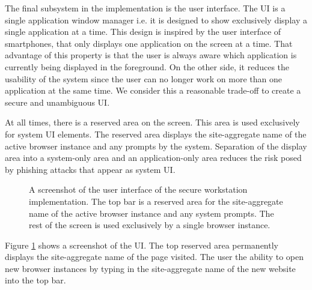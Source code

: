 The final subsystem in the implementation is the user interface. The UI is a single application window manager i.e. it is designed to show exclusively display a single application at a time. This design is inspired by the user interface of smartphones, that only displays one application on the screen at a time. That advantage of this property is that the user is always aware which application is currently being displayed in the foreground. On the other side, it reduces the usability of the system since the user can no longer work on more than one application at the same time. We consider this a reasonable trade-off to create a secure and unambiguous UI.

At all times, there is a reserved area on the screen. This area is used exclusively for system UI elements. The reserved area displays the site-aggregate name of the active browser instance and any prompts by the system. Separation of the display area into a system-only area and an application-only area reduces the risk posed by phishing attacks that appear as system UI.

\begin{figure}[p]
\centering
    \caption{A screenshot of the user interface of the secure workstation implementation. The top bar is a reserved area for the site-aggregate name of the active browser instance and any system prompts. The rest of the screen is used exclusively by a single browser instance.}
   \label{fig:ui-example}
\end{figure}

Figure \ref{fig:ui-example} shows a screenshot of the UI. The top reserved area permanently displays the site-aggregate name of the page visited. The user the ability to open new browser instances by typing in the site-aggregate name of the new website into the top bar.

